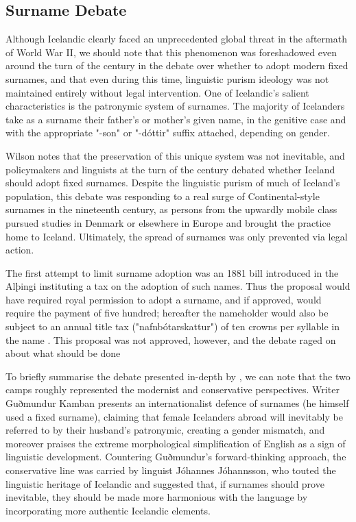 \subsection{Surname Debate}

Although Icelandic clearly faced an unprecedented global threat in the aftermath of World War II, we should note that this phenomenon was foreshadowed even around the turn of the century in the debate over whether to adopt modern fixed surnames, and that even during this time, linguistic purism ideology was not maintained entirely without legal intervention. One of Icelandic's salient characteristics is the patronymic system of surnames. The majority of Icelanders take as a surname their father's or mother's given name, in the genitive case and with the appropriate "-son" or "-dóttir" suffix attached, depending on gender.

Wilson notes that the preservation of this unique system was not inevitable, and policymakers and linguists at the turn of the century debated whether Iceland should adopt fixed surnames. Despite the linguistic purism of much of Iceland's population, this debate was responding to a real surge of Continental-style surnames in the nineteenth century, as persons from the upwardly mobile class pursued studies in Denmark or elsewhere in Europe and brought the practice home to Iceland. Ultimately, the spread of surnames was only prevented via legal action.

The first attempt to limit surname adoption was an 1881 bill introduced in the Alþingi instituting a tax on the adoption of such names. Thus the proposal would have required royal permission to adopt a surname, and if approved, would require the payment of five hundred; hereafter the nameholder would also be subject to an annual title tax ("nafnbótarskattur") of ten crowns per syllable in the name \parencite[137]{willson02}. This proposal was not approved, however, and the debate raged on about what should be done

To briefly summarise the debate presented in-depth by \textcite{willson02}, we can note that the two camps roughly represented the modernist and conservative perspectives. Writer Guðmundur Kamban presents an internationalist defence of surnames (he himself used a fixed surname), claiming that female Icelanders abroad will inevitably be referred to by their husband's patronymic, creating a gender mismatch, and moreover praises the extreme morphological simplification of English as a sign of linguistic development. Countering Guðmundur's forward-thinking approach, the conservative line was carried by linguist Jóhannes Jóhannsson, who touted the linguistic heritage of Icelandic and suggested that, if surnames should prove inevitable, they should be made more harmonious with the language by incorporating more authentic Icelandic elements.

